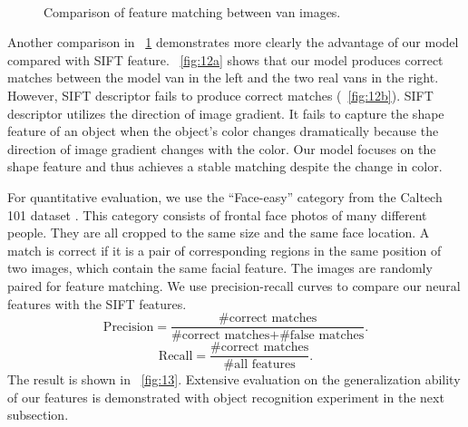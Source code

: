 \documentclass[twocolumn]{article}
\begin{document}
\begin{figure}[!t]
\centering
  \\
\caption{Comparison of feature matching between van images.}
\label{fig:12}
\end{figure}

Another comparison in \figurename~\ref{fig:12} demonstrates
more clearly the advantage of our model compared with SIFT feature.
\figurename~\ref{fig:12a} shows that our model produces correct matches
between the model van in the left and the two real vans in the right. 
However, SIFT descriptor fails to produce correct matches (\figurename~\ref{fig:12b}). 
SIFT descriptor utilizes the direction of image gradient. 
It fails to capture the shape feature of an object when the object's color changes dramatically because the direction of image gradient changes with the color. 
Our model focuses on the shape feature and thus achieves a stable matching despite the change in color.

For quantitative evaluation, we use the ``Face-easy'' category from the Caltech 101 dataset \cite{fei2007}.
This category consists of frontal face photos of many different people.
They are all cropped to the same size and the same face location.
A match is correct if it is a pair of corresponding regions in the same position of two images, which contain the same facial feature.
The images are randomly paired for feature matching.
We use precision-recall curves to compare our neural features with the SIFT features.
\begin{equation}
\text{Precision} = \frac{\text{\#correct matches}}{\text{\#correct matches} + \text{\#false matches}}.
\end{equation}
\begin{equation}
\text{Recall} = \frac{\text{\#correct matches}}{\text{\#all features}}.
\end{equation}
The result is shown in \figurename~\ref{fig:13}.
Extensive evaluation on the generalization ability of our features is demonstrated with object recognition experiment in the next subsection.
\end{document}
